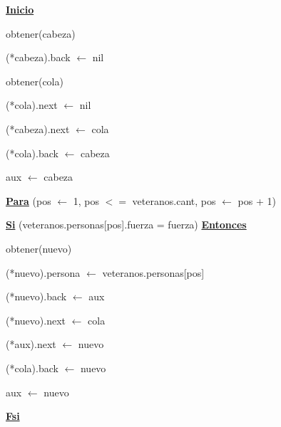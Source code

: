 \documentclass{article}
\begin{document}
        \hspace{8mm}\underline{\textbf{Inicio}}

            \hspace{12mm}obtener(cabeza)

            \hspace{12mm}(*cabeza).back $\leftarrow$ nil

            \hspace{12mm}obtener(cola)

            \hspace{12mm}(*cola).next $\leftarrow$ nil

            \hspace{12mm}(*cabeza).next $\leftarrow$ cola

            \hspace{12mm}(*cola).back $\leftarrow$ cabeza

            \hspace{12mm}aux $\leftarrow$ cabeza

            \hspace{12mm}\underline{\textbf{Para}} (pos $\leftarrow$ 1, pos $<=$ veteranos.cant, pos $\leftarrow$ pos + 1)

                \hspace{16mm}\underline{\textbf{Si}} (veteranos.personas[pos].fuerza = fuerza) \underline{\textbf{Entonces}}

                    \hspace{20mm}obtener(nuevo)

                    \hspace{20mm}(*nuevo).persona $\leftarrow$ veteranos.personas[pos]

                    \hspace{20mm}(*nuevo).back $\leftarrow$ aux

                    \hspace{20mm}(*nuevo).next $\leftarrow$ cola

                    \hspace{20mm}(*aux).next $\leftarrow$ nuevo

                    \hspace{20mm}(*cola).back $\leftarrow$ nuevo

                    \hspace{20mm}aux $\leftarrow$ nuevo

                \hspace{16mm}\underline{\textbf{Fsi}}
\end{document}
